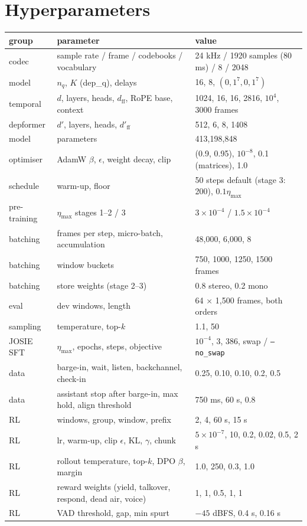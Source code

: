 \documentclass[10pt]{article}
\newcommand{\josie}{JOSIE}
\begin{document}



\appendix
\section{Hyperparameters}
{\small\begin{longtable}{lp{6.2cm}p{5.4cm}}\toprule
group & parameter & value\\\midrule
\endhead
codec & sample rate / frame / codebooks / vocabulary & 24 kHz / 1920 samples (80 ms) / 8 / 2048\\
model & $n_q$, $K$ (dep\_q), delays & 16, 8, $(0,1^7,0,1^7)$\\
temporal & $d$, layers, heads, $d_\text{ff}$, RoPE base, context & 1024, 16, 16, 2816, $10^4$, 3000 frames\\
depformer & $d'$, layers, heads, $d'_\text{ff}$ & 512, 6, 8, 1408\\
model & parameters & 413{,}198{,}848\\
optimiser & AdamW $\beta$, $\epsilon$, weight decay, clip & (0.9, 0.95), $10^{-8}$, 0.1 (matrices), 1.0\\
schedule & warm-up, floor & 50 steps default (stage 3: 200), $0.1\eta_{\max}$\\
pre-training & $\eta_{\max}$ stages 1--2 / 3 & $3\times10^{-4}$ / $1.5\times10^{-4}$\\
batching & frames per step, micro-batch, accumulation & 48{,}000, 6{,}000, 8\\
batching & window buckets & 750, 1000, 1250, 1500 frames\\
batching & store weights (stage 2--3) & 0.8 stereo, 0.2 mono\\
eval & dev windows, length & 64 $\times$ 1{,}500 frames, both orders\\
sampling & temperature, top-$k$ & 1.1, 50\\
\josie{} SFT & $\eta_{\max}$, epochs, steps, objective & $10^{-4}$, 3, 386, swap / \texttt{--no\_swap}\\
data & barge-in, wait, listen, backchannel, check-in & 0.25, 0.10, 0.10, 0.2, 0.5\\
data & assistant stop after barge-in, max hold, align threshold & 750 ms, 60 s, 0.8\\
RL & windows, group, window, prefix & 2, 4, 60 s, 15 s\\
RL & lr, warm-up, clip $\epsilon$, KL, $\gamma$, chunk & $5\times10^{-7}$, 10, 0.2, 0.02, 0.5, 2 s\\
RL & rollout temperature, top-$k$, DPO $\beta$, margin & 1.0, 250, 0.3, 1.0\\
RL & reward weights (yield, talkover, respond, dead air, voice) & 1, 1, 0.5, 1, 1\\
RL & VAD threshold, gap, min spurt & $-45$ dBFS, 0.4 s, 0.16 s\\\bottomrule
\end{longtable}}
\end{document}
